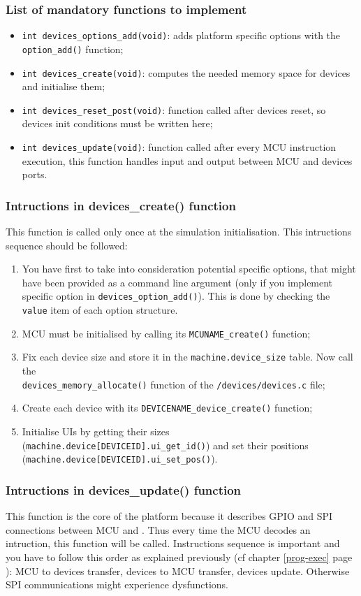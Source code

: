 \documentclass[a4paper,10pt]{report}
\begin{document}
\subsubsection{List of mandatory functions to implement}
\begin{itemize}
  \item \verb$int devices_options_add(void)$: adds platform specific options with the \verb$option_add()$ function;
  \item \verb$int devices_create(void)$: computes the needed memory space for devices and initialise them;
  \item \verb$int devices_reset_post(void)$: function called after devices reset, so devices init conditions must be written here;	
  \item \verb$int devices_update(void)$: function called after every MCU instruction execution, this function handles input and output between MCU and devices ports.
\end{itemize}

\subsubsection{Intructions in devices\_create() function}
This function is called only once at the simulation initialisation. This intructions sequence should be followed:
\begin{enumerate}
  \item You have first to take into consideration potential specific options, that might have been provided as a command line argument (only if you implement specific option in \verb$devices_option_add()$). This is done by checking the \verb$value$ item of each option structure.
  \item MCU must be initialised by calling its \verb$MCUNAME_create()$ function;
  \item Fix each device size and store it in the \verb$machine.device_size$ table. Now call the \\ \verb$devices_memory_allocate()$ function of the \verb$/devices/devices.c$ file;
  \item Create each device with its \verb$DEVICENAME_device_create()$ function;
  \item Initialise UIs by getting their sizes (\verb$machine.device[DEVICEID].ui_get_id()$) and set their positions (\verb$machine.device[DEVICEID].ui_set_pos()$).
\end{enumerate}

\subsubsection{Intructions in devices\_update() function}
\label{platform-update}
This function is the core of the platform because it describes GPIO and SPI connections between MCU and . Thus every time the MCU decodes an intruction, this function will be called.
Instructions sequence is important and you have to follow this order as explained previously (cf chapter \ref{prog-exec} page \pageref{prog-exec}): MCU to devices transfer, devices to MCU transfer, devices update. Otherwise SPI communications might experience dysfunctions.
\end{document}
